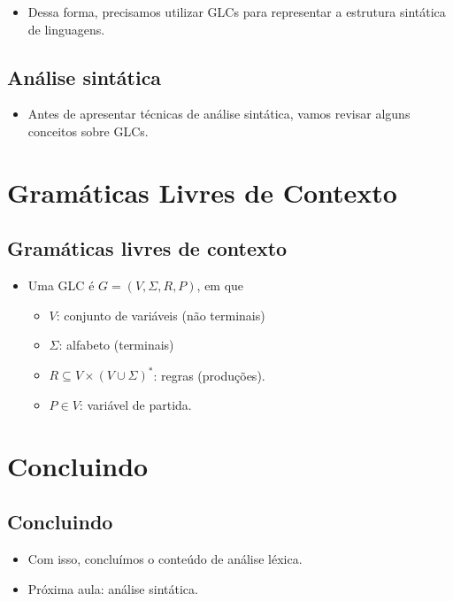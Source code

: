 \documentclass[11pt]{article}
\begin{document}
\begin{itemize}
\item Dessa forma, precisamos utilizar GLCs para representar a estrutura sintática
de linguagens.
\end{itemize}

\subsection*{Análise sintática}
\label{sec:orgc5dd19a}

\begin{itemize}
\item Antes de apresentar técnicas de análise sintática, vamos revisar alguns
conceitos sobre GLCs.
\end{itemize}

\section*{Gramáticas Livres de Contexto}
\label{sec:org7a56ee4}

\subsection*{Gramáticas livres de contexto}
\label{sec:org22c0d8b}

\begin{itemize}
\item Uma GLC é \(G=(V,\Sigma,R,P)\), em que
\begin{itemize}
\item \(V\): conjunto de variáveis (não terminais)
\item \(\Sigma\): alfabeto (terminais)
\item \(R \subseteq V\times (V\cup\Sigma)^*\): regras (produções).
\item \(P\in V\): variável de partida.
\end{itemize}
\end{itemize}

\section*{Concluindo}
\label{sec:orgc405299}

\subsection*{Concluindo}
\label{sec:orgf7b371b}

\begin{itemize}
\item Com isso, concluímos o conteúdo de análise léxica.

\item Próxima aula: análise sintática.
\end{itemize}
\end{document}
